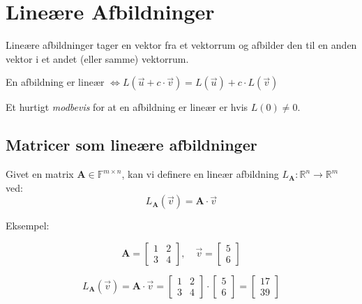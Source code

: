 \section{Lineære Afbildninger}

Lineære afbildninger tager en vektor fra et vektorrum og afbilder den til en anden vektor i et andet (eller samme) vektorrum.

En afbildning er lineær $\iff L(\vec{u} + c \cdot \vec{v}) = L(\vec{u}) + c \cdot L(\vec{v}) $


Et hurtigt \emph{modbevis} for at en afbildning er lineær er hvis $ L(0) \ne 0 $.

\subsection{Matricer som lineære afbildninger}

Givet en matrix \( \mathbf{A} \in \mathbb{F}^{m \times n}\), kan vi definere en lineær afbildning \( L_\mathbf{A} : \mathbb{R}^n \rightarrow \mathbb{R}^m \) ved:
\[
    L_\mathbf{A}(\vec v) = \mathbf{A} \cdot \vec v
\]

Eksempel:

\begin{minipage}{0.45\textwidth}
    \[
    \mathbf{A} = \begin{bmatrix}
        1 & 2 \\
        3 & 4
    \end{bmatrix}, \quad \vec v = \begin{bmatrix}
        5 \\
        6
    \end{bmatrix}
    \]
\end{minipage}
\hfill
\begin{minipage}{0.45\textwidth}
    \[
    L_\mathbf{A}(\vec v) = \mathbf{A} \cdot \vec v = \begin{bmatrix}
        1 & 2 \\
        3 & 4
    \end{bmatrix} \cdot \begin{bmatrix}
        5 \\
        6
    \end{bmatrix} = \begin{bmatrix}
        17 \\
        39
    \end{bmatrix}
    \]
\end{minipage}

